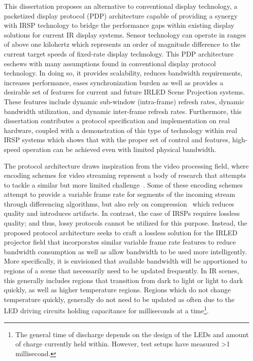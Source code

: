 This dissertation proposes an alternative to conventional display technology, a packetized display protocol (PDP) architecture capable of providing a synergy with IRSP technology to bridge the performance gaps within existing display solutions for current IR display systems. Sensor technology can operate in ranges of above one kilohertz which represents an order of magnitude difference to the current target speeds of fixed-rate display technology. This PDP architecture eschews with many assumptions found in conventional display protocol technology. In doing so, it provides scalability, reduces bandwidth requirements, increases performance, eases synchronization burden as well as provides a desirable set of features for current and future IRLED Scene Projection systems. These features include dynamic sub-window (intra-frame) refresh rates, dynamic bandwidth utilization, and dynamic inter-frame refresh rates. Furthermore, this dissertation contributes a protocol specification and implementation on real hardware, coupled with a demonstration of this type of technology within real IRSP systems which shows that with the proper set of control and features, high-speed operation can be achieved even with limited physical bandwidth.

The protocol architecture draws inspiration from the video processing field, where encoding schemes for video streaming represent a body of research that attempts to tackle a similar but more limited challenge~\cite{BakarEtAl2017}. Some of these encoding schemes attempt to provide a variable frame rate for segments of the incoming stream through differencing algorithms, but also rely on compression~\cite{CastilloEtAl2012} which reduces quality and introduces artifacts. In contrast, the case of IRSPs requires lossless quality; and thus, lossy protocols cannot be utilized for this purpose. Instead, the proposed protocol architecture seeks to craft a lossless solution for the IRLED projector field that incorporates similar variable frame rate features to reduce bandwidth consumption as well as allow bandwidth to be used more intelligently. More specifically, it is envisioned that available bandwidth will be apportioned to regions of a scene that necessarily need to be updated frequently. In IR scenes, this generally includes regions that transition from dark to light or light to dark quickly, as well as higher temperature regions. Regions which do not change temperature quickly, generally do not need to be updated as often due to the LED driving circuits holding capacitance for milliseconds at a time\footnote{The general time of discharge depends on the design of the LEDs and amount of charge currently held within. However, test setups have measured \textgreater1 millisecond.}.

